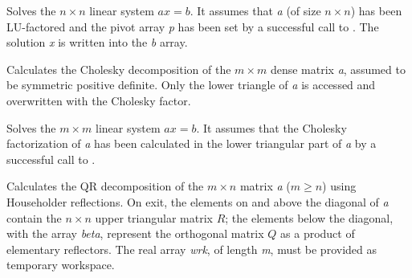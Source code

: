 \documentclass[letterpaper,10pt,english]{sphinxmanual}
\begin{document}
\begin{fulllineitems}
\label{linear_solvers/DLS:denseGETRS}
Solves the $n \times n$ linear system $ax = b$. It
assumes that \emph{a} (of size $n \times n$) has been LU-factored
and the pivot array \emph{p} has been set by a successful call to
{\hyperref[linear_solvers/DLS:denseGETRF]{}}. The solution \emph{x} is written into the \emph{b}
array.

\end{fulllineitems}


\begin{fulllineitems}
\label{linear_solvers/DLS:densePOTRF}
Calculates the Cholesky decomposition of the $m \times m$
dense matrix \emph{a}, assumed to be symmetric positive definite.  Only
the lower triangle of \emph{a} is accessed and overwritten with the
Cholesky factor.

\end{fulllineitems}


\begin{fulllineitems}
\label{linear_solvers/DLS:densePOTRS}
Solves the $m \times m$ linear system $ax = b$.  It
assumes that the Cholesky factorization of \emph{a} has been calculated
in the lower triangular part of \emph{a} by a successful call to
.

\end{fulllineitems}


\begin{fulllineitems}
\label{linear_solvers/DLS:denseGEQRF}
Calculates the QR decomposition of the $m \times n$ matrix
\emph{a} ($m \ge n$) using Householder reflections.  On exit, the
elements on and above the diagonal of \emph{a} contain the $n
\times n$ upper triangular matrix $R$; the elements below the
diagonal, with the array \emph{beta}, represent the orthogonal matrix
$Q$ as a product of elementary reflectors. The real array
\emph{wrk}, of length \emph{m}, must be provided as temporary workspace.

\end{fulllineitems}
\end{document}
